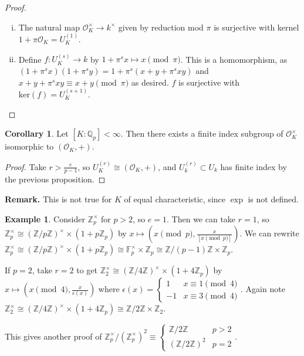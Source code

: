 \documentclass{article}
\theoremstyle{definition}
\newtheorem{cor}[theorem]{Corollary}
\newtheorem{example}{Example}[section]
\begin{document}
\begin{proof}
    \begin{enumerate}[(i)]
        \item The natural map $\mathcal{O}_K^\times \to k^{\times}$ given by reduction mod $\pi$ is surjective with kernel $1 + \pi\mathcal{O}_K = U_{K}^{(1)}$.
        \item Define $f : U_K^{(s)} \to k$ by $1 + \pi^s x \mapsto x \pmod{\pi}$. This is a homomorphism, as $(1 + \pi^s x)(1 + \pi^s y)= 1 + \pi^s(x+y+\pi^s xy)$ and $x+y+\pi^s xy \equiv x+y \pmod{\pi}$ as desired. $f$ is surjective with $\text{ker}(f) = U_K^{(s+1)}$.
    \end{enumerate}
\end{proof}
\begin{cor}
    Let $[K : \mathbb{Q}_p]<\infty$. Then there exists a finite index subgroup of $\mathcal{O}_K^\times$ isomorphic to $(\mathcal{O}_K,+)$.
\end{cor}
\begin{proof}
    Take $r>\frac{e}{p-1}$, so $U_K^{(r)} \cong (\mathcal{O}_K,+)$, and $U_k^{(r)} \subset U_k$ has finite index by the previous proposition.
\end{proof}
\textbf{Remark.} This is not true for $K$ of equal characteristic, since $\exp$ is not defined.
\begin{example}
    Consider $\mathbb{Z}_p^\times$ for $p>2$, so $e=1$. Then we can take $r=1$, so $\mathbb{Z}_p^\times \cong (\mathbb{Z}/p \mathbb{Z})^\times \times (1 + p \mathbb{Z}_p)$ by $x \mapsto (x \pmod{p}, \frac{x}{[x \pmod{p}]})$. We can rewrite $\mathbb{Z}_p^\times \cong (\mathbb{Z}/p \mathbb{Z})^\times \times (1 + p \mathbb{Z}_p) \cong \mathbb{F}_p^\times \times \mathbb{Z}_p \cong \mathbb{Z}/(p-1)\mathbb{Z} \times \mathbb{Z}_p$.
    \vspace{1mm}
     
    If $p=2$, take $r=2$ to get $\mathbb{Z}_2^{\times} \cong (\mathbb{Z}/4\mathbb{Z})^\times \times (1 + 4\mathbb{Z}_p)$ by $x \mapsto (x \pmod{4}, \frac{x}{\epsilon(x)})$ where $\epsilon(x) = \begin{cases}
        1 & x \equiv 1\pmod{4}\\
        -1 & x \equiv 3\pmod{4}
    \end{cases}$. Again note $\mathbb{Z}_2^{\times} \cong (\mathbb{Z}/4\mathbb{Z})^\times \times (1 + 4\mathbb{Z}_p) \cong \mathbb{Z}/2\mathbb{Z} \times \mathbb{Z}_2$.
\end{example}
This gives another proof of $\mathbb{Z}_p^\times/(\mathbb{Z}_p^\times)^2 \equiv \begin{cases}
    \mathbb{Z}/2\mathbb{Z} & p>2\\
    (\mathbb{Z}/2\mathbb{Z})^2 & p=2
\end{cases}$.
\end{document}
